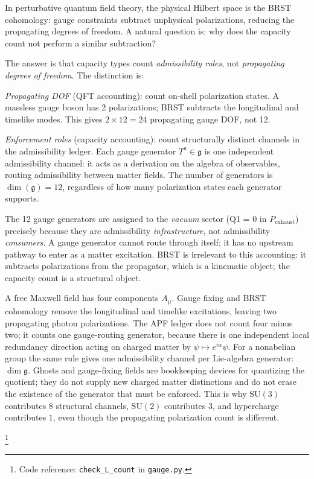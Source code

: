 \documentclass[11pt]{article}
\theoremstyle{definition}
\newcommand{\SU}{\mathrm{SU}}
\newcommand{\U}{\mathrm{U}}
\newcommand{\coderef}[2]{\footnote{Code reference: \texttt{#1} in \texttt{#2}.}}
\begin{document}
In perturbative quantum field theory, the physical Hilbert space is the
BRST cohomology: gauge constraints subtract unphysical polarizations,
reducing the propagating degrees of freedom.  A natural question is: why
does the capacity count not perform a similar subtraction?

The answer is that capacity types count \emph{admissibility roles}, not
\emph{propagating degrees of freedom}.  The distinction is:

\smallskip\noindent\textit{Propagating DOF} (QFT accounting): count
on-shell polarization states.  A massless gauge boson has 2 polarizations;
BRST subtracts the longitudinal and timelike modes.  This gives
$2 \times 12 = 24$ propagating gauge DOF, not 12.

\smallskip\noindent\textit{Enforcement roles} (capacity accounting):
count structurally distinct channels in the admissibility ledger.  Each
gauge generator $T^a \in \mathfrak{g}$ is one independent admissibility
channel: it acts as a derivation on the algebra of observables, routing
admissibility between matter fields.  The number of generators is
$\dim(\mathfrak{g}) = 12$, regardless of how many polarization states
each generator supports.

The 12 gauge generators are assigned to the \emph{vacuum} sector
(Q1 = 0 in $P_{\mathrm{exhaust}}$) precisely because they are
admissibility \emph{infrastructure}, not admissibility \emph{consumers}.
A gauge generator cannot route through itself; it has no upstream
pathway to enter as a matter excitation.  BRST is irrelevant to this
accounting: it subtracts polarizations from the propagator, which is a
kinematic object; the capacity count is a structural object.

\begin{tcolorbox}[apfbox, title={Toy $\U(1)$ gauge model: constraint subtraction vs. channel accounting}]
\footnotesize\label{ex:brst_toy_v35}
A free Maxwell field has four components $A_\mu$.  Gauge fixing and BRST cohomology remove the longitudinal and timelike excitations, leaving two propagating photon polarizations.  The APF ledger does not count four minus two; it counts one gauge-routing generator, because there is one independent local redundancy direction acting on charged matter by $\psi\mapsto e^{i\alpha}\psi$.  For a nonabelian group the same rule gives one admissibility channel per Lie-algebra generator: $\dim\mathfrak g$.  Ghosts and gauge-fixing fields are bookkeeping devices for quantizing the quotient; they do not supply new charged matter distinctions and do not erase the existence of the generator that must be enforced.  This is why $\SU(3)$ contributes $8$ structural channels, $\SU(2)$ contributes $3$, and hypercharge contributes $1$, even though the propagating polarization count is different.
\end{tcolorbox}
\coderef{check\_L\_count}{gauge.py}
\end{document}
